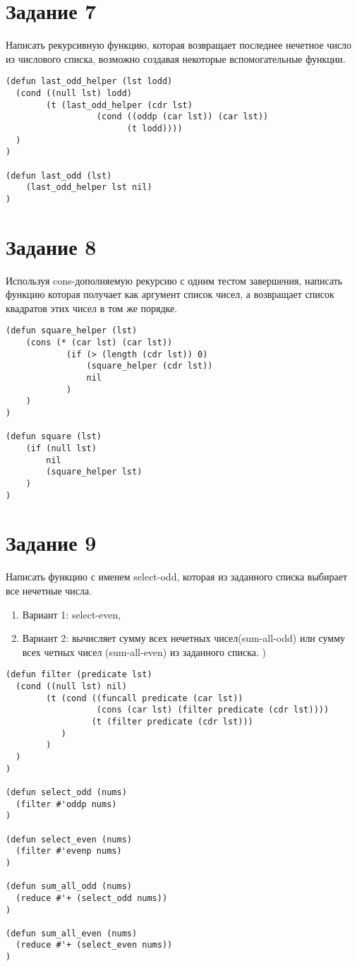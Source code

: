 \section{Задание \No{}7}

Написать рекурсивную функцию, которая возвращает последнее нечетное
число из числового списка, возможно создавая некоторые вспомогательные функции.

\begin{lstlisting}
(defun last_odd_helper (lst lodd)
  (cond ((null lst) lodd)
        (t (last_odd_helper (cdr lst)
                  (cond ((oddp (car lst)) (car lst))
                        (t lodd))))
  )
)

(defun last_odd (lst)
    (last_odd_helper lst nil)
)
\end{lstlisting}

\section{Задание \No{}8}

Используя cons-дополняемую рекурсию с одним тестом завершения,
написать функцию которая получает как аргумент список чисел, а возвращает список квадратов этих чисел в том же порядке.

\begin{lstlisting}
(defun square_helper (lst)
    (cons (* (car lst) (car lst))
            (if (> (length (cdr lst)) 0)
                (square_helper (cdr lst))
                nil
            )
    )
)

(defun square (lst)
    (if (null lst)
        nil
        (square_helper lst)
    )
)
\end{lstlisting}

\section{Задание \No{}9}

Написать функцию с именем select-odd, которая из заданного
списка выбирает все нечетные числа.
\begin{enumerate}
    \item Вариант 1: select-even,
    \item Вариант 2: вычисляет сумму всех нечетных чисел(sum-all-odd) или сумму всех четных чисел (sum-all-even) из заданного списка. )
\end{enumerate}

\begin{lstlisting}
(defun filter (predicate lst)
  (cond ((null lst) nil)
        (t (cond ((funcall predicate (car lst))
                  (cons (car lst) (filter predicate (cdr lst))))
                 (t (filter predicate (cdr lst)))
           )
        )
  )
)

(defun select_odd (nums)
  (filter #'oddp nums)
)

(defun select_even (nums)
  (filter #'evenp nums)
)

(defun sum_all_odd (nums)
  (reduce #'+ (select_odd nums))
)

(defun sum_all_even (nums)
  (reduce #'+ (select_even nums))
)
\end{lstlisting}
